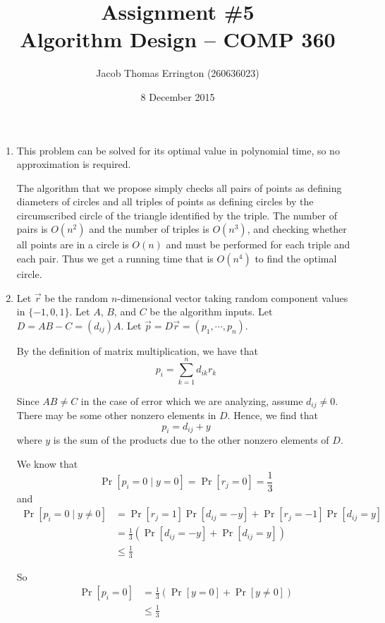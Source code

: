 \documentclass[letterpaper,11pt]{article}
\author{Jacob Thomas Errington (260636023)}
\title{Assignment \#5\\Algorithm Design -- COMP 360}
\date{8 December 2015}
\begin{document}
\maketitle

\begin{enumerate}
    \item
        This problem can be solved for its optimal value in polynomial time, so
        no approximation is required.

        The algorithm that we propose simply checks all pairs of points as
        defining diameters of circles and all triples of points as defining
        circles by the circumscribed circle of the triangle identified by the
        triple. The number of pairs is $O(n^2)$ and the number of triples is
        $O(n^3)$, and checking whether all points are in a circle is $O(n)$ and
        must be performed for each triple and each pair. Thus we get a running
        time that is $O(n^4)$ to find the optimal circle.

    \item
        Let $\vec r$ be the random $n$-dimensional vector taking random
        component values in $\{-1, 0, 1\}$. Let $A$, $B$, and $C$ be the
        algorithm inputs. Let $D = AB - C = (d_{ij})A$. Let
        $\vec p = D \vec r = (p_1, \cdots, p_n)$.

        By the definition of matrix multiplication, we have that
        $$p_i = \sum_{k=1}^n {d_{ik}r_k}$$

        Since $AB \neq C$ in the case of error which we are analyzing, assume
        $d_{ij} \neq 0$. There may be some other nonzero elements in $D$.
        Hence, we find that
        $$p_i = d_{ij} + y$$
        where $y$ is the sum of the products due to the other nonzero elements
        of $D$.

        We know that
        $$\Pr{[p_i = 0\mid y = 0] = \Pr{[r_j = 0]} = \frac{1}{3}}$$
        and
        \begin{align*}
            \Pr{[p_i = 0\mid y \neq 0]}
                &= \Pr{[r_j = 1]}\Pr{[d_{ij} = -y]}
                + \Pr{[r_j = -1]}\Pr{[d_{ij} = y]} \\
                &= \frac{1}{3}
                \left(\Pr{[d_{ij} = -y]} + \Pr{[d_{ij} = y]}\right) \\
                &\leq \frac{1}{3}
        \end{align*}

        So
        \begin{align*}
            \Pr{[p_i = 0]}
                &= \frac{1}{3}\left(\Pr{[y = 0]} + \Pr{[y \neq 0]}\right) \\
                &\leq \frac{1}{3}
        \end{align*}


\end{enumerate}
\end{document}
